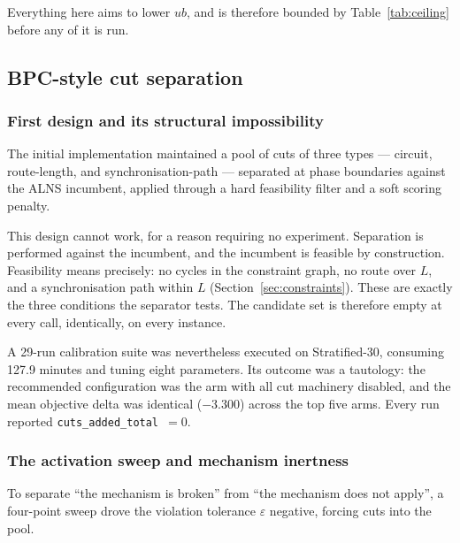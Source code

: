 \documentclass[11pt,a4paper]{article}
\begin{document}
Everything here aims to lower $ub$, and is therefore bounded by
Table~\ref{tab:ceiling} before any of it is run.

\subsection{BPC-style cut separation}\label{sec:cuts}

\subsubsection{First design and its structural impossibility}\label{sec:cuts-structural}

The initial implementation maintained a pool of cuts of three types --- circuit,
route-length, and synchronisation-path --- separated at phase boundaries against
the ALNS incumbent, applied through a hard feasibility filter and a soft scoring
penalty.

This design cannot work, for a reason requiring no experiment. Separation is
performed against the incumbent, and the incumbent is feasible by construction.
Feasibility means precisely: no cycles in the constraint graph, no route over $L$,
and a synchronisation path within $L$ (Section~\ref{sec:constraints}). These are
exactly the three conditions the separator tests. The candidate set is therefore
empty at every call, identically, on every instance.

A 29-run calibration suite was nevertheless executed on Stratified-30, consuming
127.9 minutes and tuning eight parameters. Its outcome was a tautology: the
recommended configuration was the arm with all cut machinery disabled, and the
mean objective delta was identical ($-3.300$) across the top five arms. Every run
reported \texttt{cuts\_added\_total}~$=0$.

\subsubsection{The activation sweep and mechanism inertness}\label{sec:cuts-inert}

To separate ``the mechanism is broken'' from ``the mechanism does not apply'', a
four-point sweep drove the violation tolerance $\varepsilon$ negative, forcing
cuts into the pool.
\end{document}
